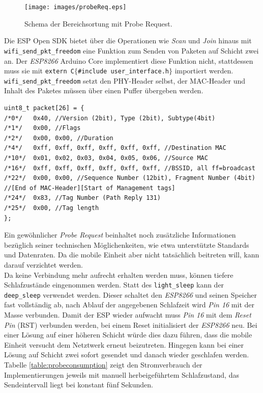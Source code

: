 \begin{figure}[h]
  \centering
	\texttt{[image: images/probeReq.eps]}
  \caption{Schema der Bereichsortung mit Probe Request.}
  \label{fig:probeReq}
\end{figure}


Die ESP Open SDK bietet über die Operationen wie \emph{Scan} und \emph{Join} hinaus mit \texttt{wifi\_send\_pkt\_freedom} eine Funktion zum Senden von Paketen auf Schicht zwei an.
Der \emph{ESP8266} Arduino Core implementiert diese Funktion nicht, stattdessen muss sie mit \texttt{extern \dq C\dq $\lbrace$\#include \dq user\_interface.h\dq $\rbrace$} importiert werden. \\
\texttt{wifi\_send\_pkt\_freedom} setzt den PHY-Header selbst, der MAC-Header und Inhalt des Paketes müssen über einen Puffer übergeben werden.
\begin{verbatim}
uint8_t packet[26] = { 
/*0*/ 	0x40, //Version (2bit), Type (2bit), Subtype(4bit)
/*1*/ 	0x00, //Flags 
/*2*/ 	0x00, 0x00, //Duration
/*4*/   0xff, 0xff, 0xff, 0xff, 0xff, 0xff, //Destination MAC
/*10*/  0x01, 0x02, 0x03, 0x04, 0x05, 0x06, //Source MAC
/*16*/  0xff, 0xff, 0xff, 0xff, 0xff, 0xff, //BSSID, all ff=broadcast
/*22*/  0x00, 0x00, //Sequence Number (12bit), Fragment Number (4bit) 
//[End of MAC-Header][Start of Management tags]
/*24*/  0x83, //Tag Number (Path Reply 131) 
/*25*/ 	0x00, //Tag length
}; 
\end{verbatim}
Ein gewöhnlicher \emph{Probe Request} beinhaltet noch zusätzliche Informationen bezüglich seiner technischen Möglichenkeiten, wie etwa unterstützte Standards und Datenraten. 
Da die mobile Einheit aber nicht tatsächlich beitreten will, kann darauf verzichtet werden. \\
Da keine Verbindung mehr aufrecht erhalten werden muss, können tiefere Schlafzustände eingenommen werden. 
Statt des \texttt{light\_sleep} kann der \texttt{deep\_sleep} verwendet werden.
Dieser schaltet den \emph{ESP8266} und seinen Speicher fast vollständig ab, nach Ablauf der angegebenen Schlafzeit wird \emph{Pin 16} mit der Masse verbunden.
Damit der ESP wieder aufwacht muss \emph{Pin 16} mit dem \emph{Reset Pin} (RST) verbunden werden, bei einem Reset initialisiert der \emph{ESP8266} neu.
Bei einer Lösung auf einer höheren Schicht würde dies dazu führen, dass die mobile Einheit versucht dem Netztwerk erneut beizutreten. 
Hingegen kann bei einer Lösung auf Schicht zwei sofort gesendet und danach wieder geschlafen werden.\\
Tabelle \ref{table:probeconsumption} zeigt den Stromverbrauch der Implementierungen jeweils mit manuell herbeigeführtem Schlafzustand, das Sendeintervall liegt bei konstant fünf Sekunden.
